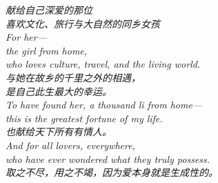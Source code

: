 
\begin{abstract}

\end{abstract}
\clearpage

\thispagestyle{empty}
\null\vfill
\begin{center}
\begin{minipage}{0.72\linewidth}
\centering\itshape\color{rose}
{\cjk 献给自己深爱的那位}\\[0.4em]
{\cjk 喜欢文化、旅行与大自然的同乡女孩}\\[0.8em]
For her---\\[0.3em]
the girl from home,\\[0.2em]
who loves culture, travel, and the living world.\\[0.8em]
{\cjk 与她在故乡的千里之外的相遇，}\\[0.2em]
{\cjk 是自己此生最大的幸运。}\\[0.6em]
To have found her, a thousand \emph{li} from home---\\[0.2em]
this is the greatest fortune of my life.\\[1.2em]
{\cjk 也献给天下所有有情人。}\\[0.3em]
And for all lovers, everywhere,\\[0.2em]
who have ever wondered what they truly possess.\\[1.0em]
{\upshape\footnotesize\color{gold} {\cjk 取之不尽，用之不竭，因为爱本身就是生成性的。}}
\end{minipage}
\end{center}
\vfill\null
\clearpage



